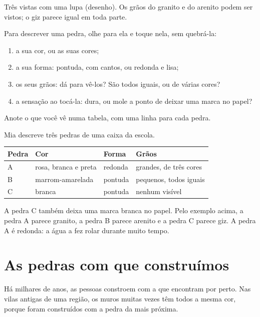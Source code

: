 \begin{omfigure}
{\small Três  vistas com uma lupa (desenho). Os grãos do granito e do
arenito podem ser vistos; o giz parece igual em toda parte.}
\label{fig:g3:stones-pebbles-sand:magnified}
\end{omfigure}

\begin{method}\label{met:g3:stones-pebbles-sand:look}
Para descrever uma pedra, olhe para ela e toque nela, sem quebrá-la:
\begin{enumerate}
  \item a sua cor, ou as suas cores;
  \item a sua forma: pontuda, com cantos, ou redonda e lisa;
  \item os seus grãos: dá para vê-los? São todos iguais, ou de várias
        cores?
  \item a sensação ao tocá-la: dura, ou mole a ponto de deixar uma marca no papel?
\end{enumerate}
Anote o que você vê numa tabela, com uma linha para cada pedra.
\end{method}

\begin{example}\label{ex:g3:stones-pebbles-sand:table}
Mia descreve três pedras de uma caixa da escola.
\begin{center}\small
\begin{tabular}{llll}
\hline
Pedra & Cor & Forma & Grãos \\
\hline
A & rosa, branca e preta & redonda & grandes, de três cores \\
B & marrom-amarelada & pontuda & pequenos, todos iguais \\
C & branca & pontuda & nenhum visível \\
\hline
\end{tabular}
\end{center}
A pedra C também deixa uma marca branca no papel. Pelo exemplo acima, a
pedra A parece granito, a pedra B parece arenito e a pedra C parece giz. A
pedra A é redonda: a água a fez rolar durante muito tempo.
\end{example}

\section{As pedras com que construímos}

Há milhares de anos, as pessoas constroem com a  que encontram por
perto. Nas vilas antigas de uma região, os muros muitas vezes têm todos a
mesma cor, porque foram construídos com a pedra da  mais próxima.

